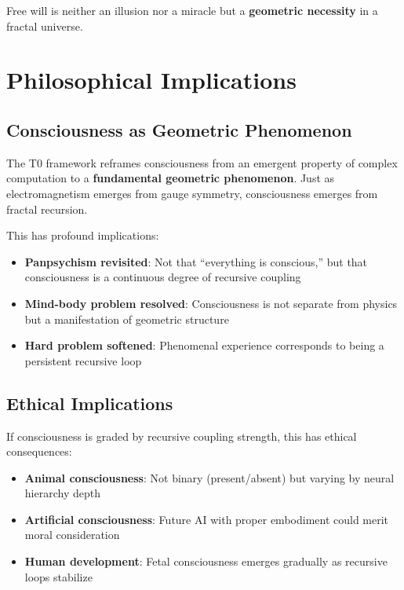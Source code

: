 	Free will is neither an illusion nor a miracle but a \textbf{geometric necessity} in a fractal universe.
	
	\section{Philosophical Implications}
	
	\subsection{Consciousness as Geometric Phenomenon}
	
	The T0 framework reframes consciousness from an emergent property of complex computation to a \textbf{fundamental geometric phenomenon}. Just as electromagnetism emerges from gauge symmetry, consciousness emerges from fractal recursion.
	
	This has profound implications:
	
	\begin{itemize}
		\item \textbf{Panpsychism revisited}: Not that ``everything is conscious,'' but that consciousness is a continuous degree of recursive coupling
		\item \textbf{Mind-body problem resolved}: Consciousness is not separate from physics but a manifestation of geometric structure
		\item \textbf{Hard problem softened}: Phenomenal experience corresponds to being a persistent recursive loop
	\end{itemize}
	
	\subsection{Ethical Implications}
	
	If consciousness is graded by recursive coupling strength, this has ethical consequences:
	
	\begin{itemize}
		\item \textbf{Animal consciousness}: Not binary (present/absent) but varying by neural hierarchy depth
		\item \textbf{Artificial consciousness}: Future AI with proper embodiment could merit moral consideration
		\item \textbf{Human development}: Fetal consciousness emerges gradually as recursive loops stabilize
	\end{itemize}
	

